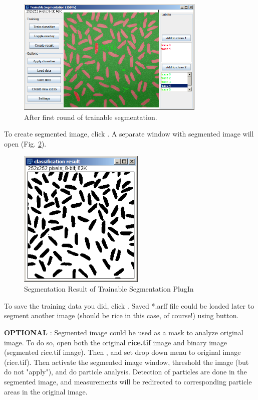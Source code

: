 \begin{indentexercise}{1}
\begin{figure}[htbp]
\begin{center}
\includegraphics[width=9cm]{fig/CMCIBasicCourse201102-img123.png}
\caption{ After first round of trainable segmentation.}
\label{fig:img123}
\end{center}
\end{figure}

To create segmented image, click . 
A separate window with segmented image will open (Fig. \ref{fig:img124}). 

\begin{figure}[htbp]
\begin{center}
\includegraphics[width=6cm]{fig/CMCIBasicCourse201102-img124.png}
\caption{ Segmentation Result of Trainable Segmentation PlugIn}
\label{fig:img124}
\end{center}
\end{figure}

To save the training data you did, click . 
Saved *.arff file could be loaded later to segment another image 
(should be rice in this case, of course!) using  button.

\textbf{OPTIONAL} : Segmented image could be used as a mask to analyze original image. 
To do so, open both the original \textbf{rice.tif} image and binary image (segmented rice.tif image).
Then , and set  drop down menu to
original image (rice.tif). Then activate the segmented image window, threshold the image (but do not
"apply"), and do particle analysis. 
Detection of particles are done in the segmented image, and
measurements will be redirected to corresponding particle areas in the
original image.  
\end{indentexercise}

